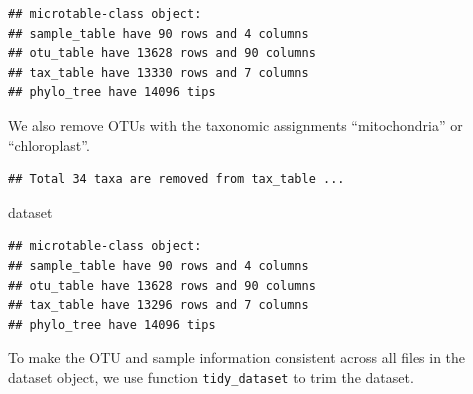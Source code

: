 \documentclass[
]{book}
\newenvironment{Shaded}{\begin{snugshade}}{\end{snugshade}}
\newcommand{\AttributeTok}[1]{\textcolor[rgb]{0.77,0.63,0.00}{#1}}
\newcommand{\CommentTok}[1]{\textcolor[rgb]{0.56,0.35,0.01}{\textit{#1}}}
\newcommand{\FunctionTok}[1]{\textcolor[rgb]{0.00,0.00,0.00}{#1}}
\newcommand{\NormalTok}[1]{#1}
\newcommand{\SpecialCharTok}[1]{\textcolor[rgb]{0.00,0.00,0.00}{#1}}
\newcommand{\StringTok}[1]{\textcolor[rgb]{0.31,0.60,0.02}{#1}}
\begin{document}
\begin{verbatim}
## microtable-class object:
## sample_table have 90 rows and 4 columns
## otu_table have 13628 rows and 90 columns
## tax_table have 13330 rows and 7 columns
## phylo_tree have 14096 tips
\end{verbatim}

We also remove OTUs with the taxonomic assignments ``mitochondria'' or ``chloroplast''.

\begin{Shaded}
\end{Shaded}

\begin{verbatim}
## Total 34 taxa are removed from tax_table ...
\end{verbatim}

\begin{Shaded}
\begin{Highlighting}[]
\NormalTok{dataset}
\end{Highlighting}
\end{Shaded}

\begin{verbatim}
## microtable-class object:
## sample_table have 90 rows and 4 columns
## otu_table have 13628 rows and 90 columns
## tax_table have 13296 rows and 7 columns
## phylo_tree have 14096 tips
\end{verbatim}

To make the OTU and sample information consistent across all files in the dataset object, we use function \texttt{tidy\_dataset} to trim the dataset.

\begin{Shaded}
\end{Shaded}
\end{document}
